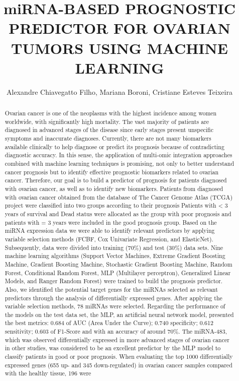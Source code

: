 \documentclass[twoside]{article}
\title{\vspace{-15mm}\fontsize{24pt}{10pt}\selectfont\textbf{ miRNA-BASED PROGNOSTIC PREDICTOR FOR OVARIAN TUMORS USING MACHINE LEARNING }} %
\author{ Alexandre Chiavegatto Filho,  Mariana Boroni,  Cristiane Esteves Teixeira }
\affil{ Brazilian National Cancer Institute (INCA) }
\date{}
\begin{document}
  
  
  \maketitle %
  
  
  \thispagestyle{fancy} %
  
  
  \begin{abstract}
  Ovarian cancer is one of the neoplasms with the highest incidence among women worldwide,  with significantly high mortality. The vast majority of patients are diagnosed in advanced stages of the disease since early stages present unspecific symptoms and inaccurate diagnoses. Currently,  there are not many biomarkers available clinically to help diagnose or predict its prognosis because of contradicting diagnostic accuracy. In this sense,  the application of multi-omic integration approaches combined with machine learning techniques is promising,  not only to better understand cancer prognosis but to identify effective prognostic biomarkers related to ovarian cancer. Therefore,  our goal is to build a predictor of prognosis for patients diagnosed with ovarian cancer,  as well as to identify new biomarkers. Patients from diagnosed with ovarian cancer obtained from the database of The Cancer Genome Atlas (TCGA) project were classified into two groups according to their prognosis Patients with < 3 years of survival and Dead status were allocated as the group with poor prognosis and patients with = 3 years were included in the good prognosis group. Based on the miRNA expression data we were able to identify relevant predictors by applying variable selection methods (FCBF,  Cox Univariate Regression,  and ElasticNet). Subsequently,  data were divided into training (70\%) and test (30\%) data sets. Nine machine learning algorithms (Support Vector Machines,  Extreme Gradient Boosting Machine,  Gradient Boosting Machine,  Stochastic Gradient Boosting Machine,  Random Forest,  Conditional Random Forest,  MLP (Multilayer perceptron),  Generalized Linear Models,  and Ranger Random Forest) were trained to build the prognosis predictor. Also,  we identified the potential target genes for the miRNAs selected as relevant predictors through the analysis of differentially expressed genes. After applying the variable selection methods,  78 miRNAs were selected. Regarding the performance of the models on the test data set,  the MLP,  an artificial neural network model,  presented the best metrics: 0.684 of AUC (Area Under the Curve); 0.740 specificity; 0.612 sensitivity; 0.603 of F1-Score and with an accuracy of around 70\%. The miRNA-483,  which was observed differentially expressed in more advanced stages of ovarian cancer in other studies,  was considered to be an excellent predictor by the MLP model to classify patients in good or poor prognosis. When evaluating the top 1000 differentially expressed genes (655 up- and 345 down-regulated) in ovarian cancer samples compared with the healthy tissue,  196 were 
\end{abstract}
\end{document}

